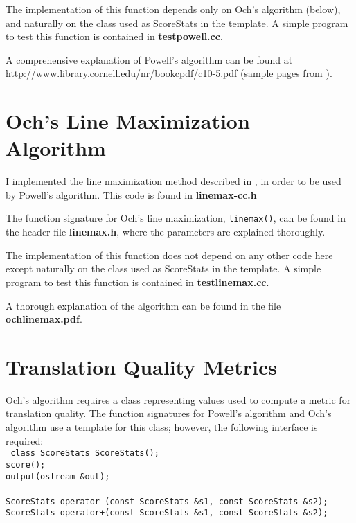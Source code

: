\documentclass[12pt]{amsart}
\newcommand{\file}{\textbf} \newcommand{\url}{\underline}
\newcommand{\code}[1]{{\small \texttt{#1}}}
\begin{document}
The implementation of this function depends only on Och's algorithm (below),
and naturally on the class used as ScoreStats in the template.  A simple
program to test this function is contained in \file{testpowell.cc}.

A comprehensive explanation of Powell's algorithm can be found at
\url{http://www.library.cornell.edu/nr/bookcpdf/c10-5.pdf} (sample pages from
\cite{NR-C}).

\section*{Och's Line Maximization Algorithm}

I implemented the line maximization method described in \cite{och-linemin}, in
order to be used by Powell's algorithm.  This code is found in
\file{linemax-cc.h}

The function signature for Och's line maximization, \code{linemax()}, can be found in the header file \file{linemax.h}, where the parameters are explained thoroughly.

The implementation of this function does not depend on any other code here
except naturally on the class used as ScoreStats in the template.  A simple
program to test this function is contained in \file{testlinemax.cc}.

A thorough explanation of the algorithm can be found in the file
\file{ochlinemax.pdf}.

\section*{Translation Quality Metrics}

Och's algorithm requires a class representing values used to compute a metric
for translation quality.  The function signatures for Powell's algorithm and
Och's algorithm use a template for this class; however, the following interface
is required: \\ \code{
  class ScoreStats {\indent ScoreStats(); \\
    \indent score(); \\ \indent output(ostream \&out); \\
  } \\ ScoreStats operator-(const ScoreStats \&s1, const ScoreStats \&s2); \\
  ScoreStats operator+(const ScoreStats \&s1, const ScoreStats \&s2);
}
\end{document}
